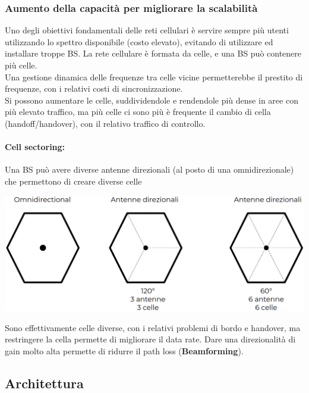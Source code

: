 
\newpage

\subsubsection{Aumento della capacità per migliorare la scalabilità}
 
Uno degli obiettivi fondamentali delle reti cellulari è servire sempre più utenti utilizzando lo spettro disponibile (costo elevato), evitando di utilizzare ed installare troppe BS. La rete cellulare è formata da celle, e una BS può contenere più celle.\\ 

Una gestione dinamica delle frequenze tra celle vicine permetterebbe il prestito di frequenze, con i relativi costi di sincronizzazione.\\

Si possono aumentare le celle, suddividendole e rendendole più dense in aree con più elevato traffico, ma più celle ci sono più è frequente il cambio di cella (handoff/handover), con il relativo traffico di controllo.\\

\paragraph{Cell sectoring:} Una BS può avere diverse antenne direzionali (al posto di una omnidirezionale) che permettono di creare diverse celle
\begin{center}
	\includegraphics[width=0.8\linewidth]{img/mobile/sectoring}
\end{center}

Sono effettivamente celle diverse, con i relativi problemi di bordo e handover, ma restringere la cella permette di migliorare il data rate. Dare una direzionalità di gain molto alta permette di ridurre il path loss (\textbf{Beamforming}).\\

\newpage

\subsection{Architettura}

